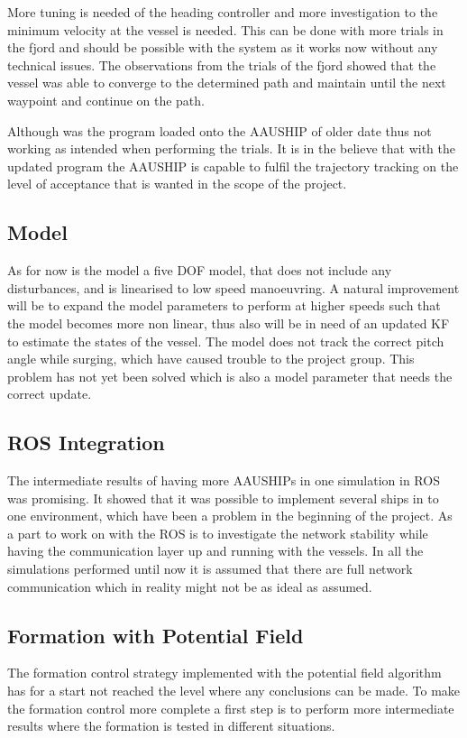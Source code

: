 More tuning is needed of the heading controller and more investigation to the minimum velocity at the vessel is needed. This can be done with more trials in the fjord and should be possible with the system as it works now without any technical issues. The observations from the trials of the fjord showed that the vessel was able to converge to the determined path and maintain until the next waypoint and continue on the path.

Although was the program loaded onto the AAUSHIP of older date thus not working as intended when performing the trials. It is in the believe that with the updated program the AAUSHIP is capable to fulfil the trajectory tracking on the level of acceptance that is wanted in the scope of the project.

\subsection{Model}
As for now is the model a five \ac{DOF} model, that does not include any disturbances, and is linearised to low speed manoeuvring. A natural improvement will be to expand the model parameters to perform at higher speeds such that the model becomes more non linear, thus also will be in need of an updated \ac{KF} to estimate the states of the vessel. The model does not track the correct pitch angle while surging, which have caused trouble to the project group. This problem has not yet been solved which is also a model parameter that needs the correct update.

\subsection{ROS Integration}
The intermediate results of having more AAUSHIPs in one simulation in \ac{ROS} was promising. It showed that it was possible to implement several ships in to one environment, which have been a problem in the beginning of the project. As a part to work on with the \ac{ROS} is to investigate the network stability while having the communication layer up and running with the vessels. In all the simulations performed until now it is assumed that there are full network communication which in reality might not be as ideal as assumed.

\subsection{Formation with Potential Field}
The formation control strategy implemented with the potential field algorithm has for a start not reached the level where any conclusions can be made. To make the formation control more complete a first step is to perform more intermediate results where the formation is tested in different situations.

